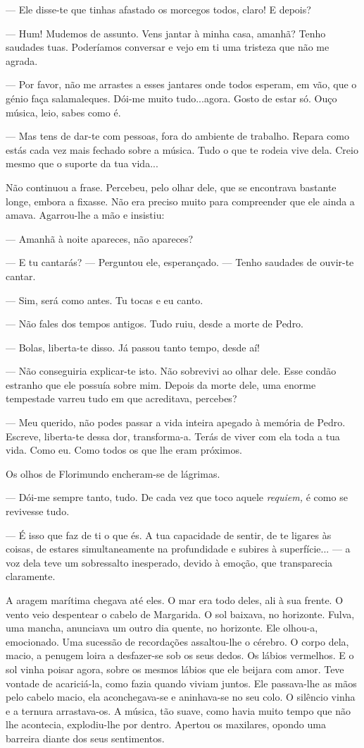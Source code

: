 --- Ele disse-te que tinhas afastado os morcegos todos, claro! E depois?

--- Hum! Mudemos de assunto. Vens jantar à minha casa, amanhã? Tenho
saudades tuas. Poderíamos conversar e vejo em ti uma tristeza que não me
agrada.

--- Por favor, não me arrastes a esses jantares onde todos esperam, em
vão, que o génio faça salamaleques. Dói-me muito tudo...agora. Gosto de
estar só. Ouço música, leio, sabes como é.

--- Mas tens de dar-te com pessoas, fora do ambiente de trabalho. Repara
como estás cada vez mais fechado sobre a música. Tudo o que te rodeia
vive dela. Creio mesmo que o suporte da tua vida...

Não continuou a frase. Percebeu, pelo olhar dele, que se encontrava
bastante longe, embora a fixasse. Não era preciso muito para compreender
que ele ainda a amava. Agarrou-lhe a mão e insistiu:

--- Amanhã à noite apareces, não apareces?

--- E tu cantarás? --- Perguntou ele, esperançado. --- Tenho saudades de
ouvir-te cantar.

--- Sim, será como antes. Tu tocas e eu canto.

--- Não fales dos tempos antigos. Tudo ruiu, desde a morte de Pedro.

--- Bolas, liberta-te disso. Já passou tanto tempo, desde aí!

--- Não conseguiria explicar-te isto. Não sobrevivi ao olhar dele. Esse
condão estranho que ele possuía sobre mim. Depois da morte dele, uma
enorme tempestade varreu tudo em que acreditava, percebes?

--- Meu querido, não podes passar a vida inteira apegado à memória de
Pedro. Escreve, liberta-te dessa dor, transforma-a. Terás de viver com
ela toda a tua vida. Como eu. Como todos os que lhe eram próximos.

Os olhos de Florimundo encheram-se de lágrimas.

--- Dói-me sempre tanto, tudo. De cada vez que toco aquele \emph{requiem,}
é como se revivesse tudo.

--- É isso que faz de ti o que és. A tua capacidade de sentir, de te
ligares às coisas, de estares simultaneamente na profundidade e subires
à superfície... --- a voz dela teve um sobressalto inesperado, devido à
emoção, que transparecia claramente.

A aragem marítima chegava até eles. O mar era todo deles, ali à sua
frente. O vento veio despentear o cabelo de Margarida. O sol baixava, no
horizonte. Fulva, uma mancha, anunciava um outro dia quente, no
horizonte. Ele olhou-a, emocionado. Uma sucessão de recordações
assaltou-lhe o cérebro. O corpo dela, macio, a penugem loira a
desfazer-se sob os seus dedos. Os lábios vermelhos. E o sol vinha poisar
agora, sobre os mesmos lábios que ele beijara com amor. Teve vontade de
acariciá-la, como fazia quando viviam juntos. Ele passava-lhe as mãos
pelo cabelo macio, ela aconchegava-se e aninhava-se no seu colo. O
silêncio vinha e a ternura arrastava-os. A música, tão suave, como havia
muito tempo que não lhe acontecia, explodiu-lhe por dentro. Apertou os
maxilares, opondo uma barreira diante dos seus sentimentos.

